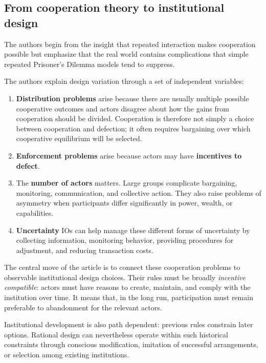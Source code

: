 \subsection{From cooperation theory to institutional design}

The authors begin from the insight that repeated interaction makes cooperation possible but emphasize that the real world contains complications that simple repeated Prisoner's Dilemma models tend to suppress.

The authors explain design variation through a set of independent variables:

\begin{enumerate}
    \item \textbf{Distribution problems} arise because there are usually multiple possible cooperative outcomes and actors disagree about how the gains from cooperation should be divided. Cooperation is therefore not simply a choice between cooperation and defection; it often requires bargaining over which cooperative equilibrium will be selected.

    \item \textbf{Enforcement problems} arise because actors may have \textbf{incentives to defect}.

    \item The \textbf{number of actors} matters. Large groups complicate bargaining, monitoring, communication, and collective action. They also raise problems of asymmetry when participants differ significantly in power, wealth, or capabilities.

    \item \textbf{Uncertainty} IOs can help manage these different forms of uncertainty by collecting information, monitoring behavior, providing procedures for adjustment, and reducing transaction costs.
\end{enumerate}

The central move of the article is to connect these cooperation problems to observable institutional design choices. Their rules must be broadly \emph{incentive compatible}: actors must have reasons to create, maintain, and comply with the institution over time. It means that, in the long run, participation must remain preferable to abandonment for the relevant actors.

Institutional development is also path dependent: previous rules constrain later options. Rational design can nevertheless operate within such historical constraints through conscious modification, imitation of successful arrangements, or selection among existing institutions.

